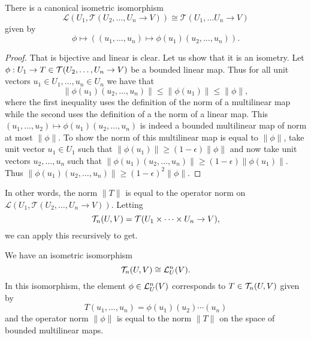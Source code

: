 \documentclass[twoside, a4paper, 10pt]{amsart}
\begin{document}
\begin{prop} There is a canonical isometric isomorphism $$ \mathcal{L}(U_1, \mathcal{T}(U_2, \ldots, U_n \to V)) \cong \mathcal{T}(U_1, \ldots U_n \to V)$$ given by $$\phi \mapsto ((u_1, \ldots, u_n) \mapsto \phi(u_1)(u_2, \ldots, u_n)).$$  \end{prop}

\begin{proof} That is bijective and linear is clear. Let us show that it is an isometry. Let $\phi:U_1 \to T \in \mathcal{T}(U_2, \ldots, U_n \to V)$ be a bounded linear map. Thus for all unit vectors $u_1 \in U_1, \ldots, u_n \in U_n$ we have that $$\|\phi(u_1)(u_2, \ldots, u_n) \| \leq \|\phi(u_1)\| \leq \|\phi\|,$$ where the first inequality uses the definition of the norm of a multilinear map while the second uses the definition of a the norm of a linear map. This $(u_1, \ldots, u_2) \mapsto \phi(u_1)(u_2, \ldots, u_n)$ is indeed a bounded multilinear map of norm at most $\|\phi \|$. To show the norm of this multilinear map is equal to $\|\phi\|$, take unit vector $u_1 \in U_1$ such that $\|\phi(u_1) \| \geq (1-\epsilon) \|\phi\|$ and now take unit vectors $u_2, \ldots, u_n$ such that $\|\phi(u_1)(u_2, \ldots, u_n)\| \geq (1-\epsilon) \|\phi(u_1)\|$. Thus $\| \phi(u_1)(u_2, \ldots, u_n) \| \geq (1-\epsilon)^2 \|\phi\|$.

\end{proof}

In other words, the norm $\| T \|$ is equal to the operator norm on $\mathcal{L}(U_1, \mathcal{T}(U_2, \ldots, U_n \to V)).$ Letting $$\mathcal{T}_n(U,V) = \mathcal{T}(U_1 \times \cdots \times U_n \to V),$$we can apply this recursively to get.

\begin{corol} We have an isometric isomorphism $$\mathcal{T}_n(U,V) \cong \mathcal{L}^n_U(V).$$ 
In this isomorphism, the element $\phi \in \mathcal{L}^n_U(V)$ corresponds to $T \in \mathcal{T}_n(U,V)$ given by $$T(u_1, \ldots, u_n) = \phi(u_1)(u_2) \cdots(u_n)$$ and the operator norm $\|\phi\|$ is equal to the norm $\|T\|$ on the space of bounded multilinear maps.

\end{corol}
\end{document}
